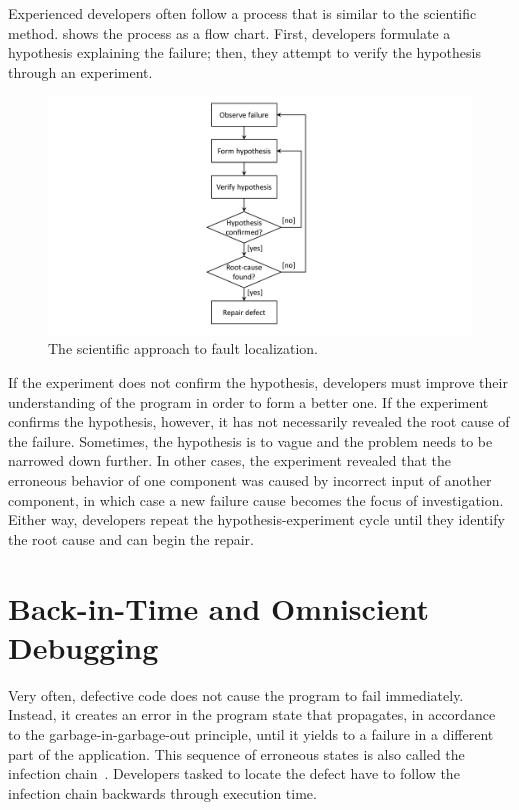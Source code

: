Experienced developers often follow a process that is similar to the scientific method.
 shows the process as a flow chart.
First, developers formulate a hypothesis explaining the failure; then, they attempt to verify the hypothesis through an experiment. 
\begin{figure}[th]
\centering
\includegraphics[width=.4\linewidth]{img/workflow-scientific-method}
\caption{The scientific approach to fault localization.}
\label{fig:scientifiy-method}
\end{figure}
If the experiment does not confirm the hypothesis, developers must improve their understanding of the program in order to form a better one.
If the experiment confirms the hypothesis, however, it has not necessarily revealed the root cause of the failure.
Sometimes, the hypothesis is to vague and the problem needs to be narrowed down further.
In other cases, the experiment revealed that the erroneous behavior of one component was caused by incorrect input of another component, in which case a new failure cause becomes the focus of investigation.
Either way, developers repeat the hypothesis-experiment cycle until they identify the root cause and can begin the repair.

\section{Back-in-Time and Omniscient Debugging}
\label{sec:omni-debugging}

Very often, defective code does not cause the program to fail immediately.
Instead, it creates an error in the program state that propagates, in accordance to the garbage-in-garbage-out principle, until it yields to a failure in a different part of the application.
This sequence of erroneous states is also called the infection chain~\cite{zeller09:why_programs_fail}.
Developers tasked to locate the defect have to follow the infection chain backwards through execution time.



